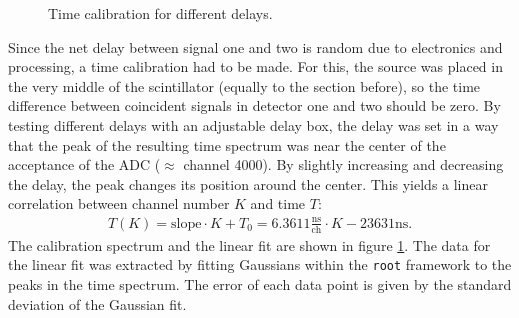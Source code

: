 \begin{figure}[b!]
	\centering
	\hfill
	\hfill
	\caption[Time calibration]{Time calibration for different delays.}
	\label{fig:ch5:calibration}
\end{figure}
Since the net delay between signal one and two is random due to electronics and processing, a time calibration had to be made. For this, the \sr{} source was placed in the very middle of the scintillator (equally to the section before), so the time difference between coincident signals in detector one and two should be zero. By testing different delays with an adjustable delay box, the delay was set in a way that the peak of the resulting time spectrum was near the center of the acceptance of the ADC ($\approx$ channel 4000). By slightly increasing and decreasing the delay, the peak changes its position around the center. This yields a linear correlation between channel number $K$ and time $T$:
\begin{align*}
T(K)=\text{slope}\cdot K + T_0 = 6.3611\frac{\si{\nano\second}}{\text{ch}}\cdot K-23631\si{\nano\second}.
\end{align*}
The calibration spectrum and the linear fit are shown in figure \ref{fig:ch5:calibration}. The data for the linear fit was extracted by fitting Gaussians within the \texttt{root} framework to the peaks in the time spectrum. The error of each data point is given by the standard deviation of the Gaussian fit.\par      
